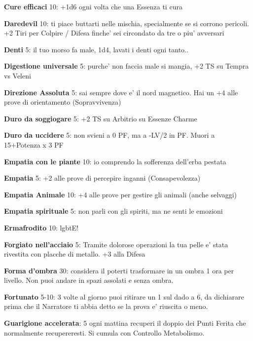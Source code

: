 \documentclass[a4paper,11pt,twoside,openany]{book}
\begin{document}
	\textbf{Cure efficaci} 10: +1d6 ogni volta che una Essenza
	ti cura
	
	\textbf{Daredevil} 10: ti piace buttarti nelle mischia, specialmente se si corrono pericoli. +2 Tiri per Colpire / Difesa finche' sei circondato da tre o piu' avversari
	
	\textbf{Denti} 5: il tuo morso fa male, 1d4, lavati i denti ogni tanto..
	
	\textbf{Digestione universale} 5: purche' non faccia male si mangia, +2 TS su Tempra vs Veleni
	
	\textbf{Direzione Assoluta} 5: sai sempre dove e' il nord magnetico. Hai un +4 alle prove di orientamento (Sopravvivenza)
	
	\textbf{Duro da soggiogare} 5: +2 TS su Arbitrio su Essenze Charme
	
	\textbf{Duro da uccidere} 5: non svieni a 0 PF, ma a -LV/2 in PF. Muori a 15+Potenza x 3 PF
	
	\textbf{Empatia con le piante} 10: io comprendo la sofferenza dell'erba pestata
	
	\textbf{Empatia} 5: +2 alle prove di percepire inganni (Consapevolezza)
	
	\textbf{Empatia Animale} 10: +4 alle prove per gestire gli animali (anche selvaggi)
	
	\textbf{Empatia spirituale} 5: non parli con gli spiriti, ma ne senti le emozioni
	
	\textbf{Ermafrodito} 10: lgbtE!
	
	\textbf{Forgiato nell'acciaio} 5: Tramite dolorose operazioni la tua pelle e' stata rivestita con placche di metallo. +3 alla Difesa
	
	\textbf{Forma d'ombra} 30: considera il poterti trasformare in un ombra 1 ora per livello. Non puoi andare in spazi assolati e senza ombra.
	
	\textbf{Fortunato} 5-10: 3 volte al giorno puoi ritirare un 1 sul dado a 6, da dichiarare prima che il Narratore ti abbia detto se la prova e' riuscita o meno.
	
	\textbf{Guarigione accelerata}: 5 ogni mattina recuperi il doppio dei Punti Ferita che normalmente recupereresti. Si cumula con Controllo Metabolismo. 
	
\end{document}
